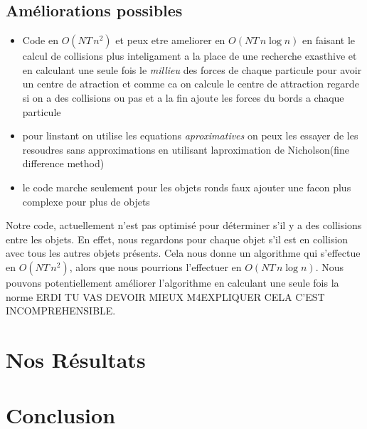     \subsection{Améliorations possibles}
        \begin{itemize}
            \item Code en $O(NT\,n^2)$ et peux etre ameliorer en $O(NT\, n\log n)$ en faisant le calcul de collisions plus inteligament a la place de une recherche exasthive et en calculant une seule fois le \textit{millieu} des forces de chaque particule pour avoir un centre de atraction et comme ca on calcule le centre de attraction regarde si on a des collisions ou pas et a la fin ajoute les forces du bords a chaque particule
            \item pour linstant on utilise les equations \textit{aproximatives} on peux les essayer de les resoudres sans approximations en utilisant laproximation de Nicholson(fine difference method)
            \item le code marche seulement pour les objets ronds faux ajouter une facon plus complexe pour plus de objets
        \end{itemize}
        Notre code, actuellement n'est pas optimisé pour déterminer s'il y a des collisions entre les objets. En effet, nous regardons pour chaque objet s'il est en collision avec tous les autres objets présents. Cela nous donne un algorithme qui s'effectue en $O(NT\,n^2)$, alors que nous pourrions l'effectuer en $O(NT\, n\log n)$. Nous pouvons potentiellement améliorer l'algorithme en calculant une seule fois la norme ERDI TU VAS DEVOIR MIEUX M4EXPLIQUER CELA C'EST INCOMPREHENSIBLE.

        
\section{Nos Résultats}
\section*{Conclusion}
